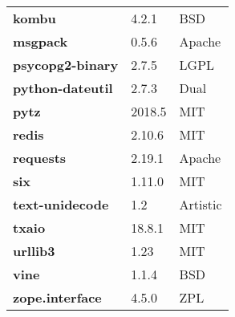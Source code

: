 \begin{longtable}{| p{} | p{} | p{} |}
\textbf{kombu} & 4.2.1 & BSD \\
\textbf{msgpack} & 0.5.6 & Apache \\
\textbf{psycopg2-binary} & 2.7.5 & LGPL \\
\textbf{python-dateutil} & 2.7.3 & Dual \\
\textbf{pytz} & 2018.5 & MIT \\
\textbf{redis} & 2.10.6 & MIT \\
\textbf{requests} & 2.19.1 & Apache \\
\textbf{six} & 1.11.0 & MIT \\
\textbf{text-unidecode} & 1.2 & Artistic \\
\textbf{txaio} & 18.8.1 & MIT \\
\textbf{urllib3} & 1.23 & MIT \\
\textbf{vine} & 1.1.4 & BSD \\
\textbf{zope.interface} & 4.5.0 & ZPL \\
\hline
\end{longtable}

